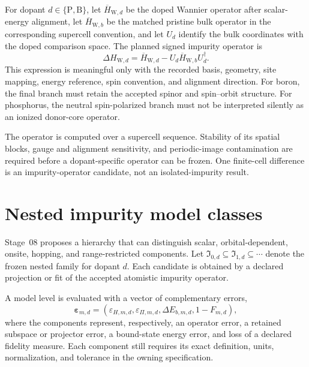 For dopant $d\in\{\mathrm P,\mathrm B\}$, let
$\overline H_{\mathrm W,d}$ be the doped Wannier operator after scalar-energy
alignment, let $\overline H_{\mathrm W,b}$ be the matched pristine bulk
operator in the corresponding supercell convention, and let $U_d$ identify the
bulk coordinates with the doped comparison space. The planned signed impurity
operator is
\begin{equation}
  \Delta H_{\mathrm W,d}
  =
  \overline H_{\mathrm W,d}
  -
  U_d\overline H_{\mathrm W,b}U_d^{\dagger}.
\end{equation}
This expression is meaningful only with the recorded basis, geometry, site
mapping, energy reference, spin convention, and alignment direction. For boron,
the final branch must retain the accepted spinor and spin--orbit structure. For
phosphorus, the neutral spin-polarized branch must not be interpreted silently
as an ionized donor-core operator.

The operator is computed over a supercell sequence. Stability of its spatial
blocks, gauge and alignment sensitivity, and periodic-image contamination are
required before a dopant-specific operator can be frozen. One finite-cell
difference is an impurity-operator candidate, not an isolated-impurity result.

\section{Nested impurity model classes}

Stage~08 proposes a hierarchy that can distinguish scalar, orbital-dependent,
onsite, hopping, and range-restricted components. Let
$\mathfrak I_{0,d}\subseteq\mathfrak I_{1,d}\subseteq\cdots$ denote the frozen
nested family for dopant $d$. Each candidate is obtained by a declared
projection or fit of the accepted atomistic impurity operator.

A model level is evaluated with a vector of complementary errors,
\begin{equation}
  \boldsymbol\varepsilon_{m,d}
  =
  \left(
    \varepsilon_{H,m,d},
    \varepsilon_{\Pi,m,d},
    \Delta E_{b,m,d},
    1-F_{m,d}
  \right),
\end{equation}
where the components represent, respectively, an operator error, a retained
subspace or projector error, a bound-state energy error, and loss of a declared
fidelity measure. Each component still requires its exact definition, units,
normalization, and tolerance in the owning specification.

